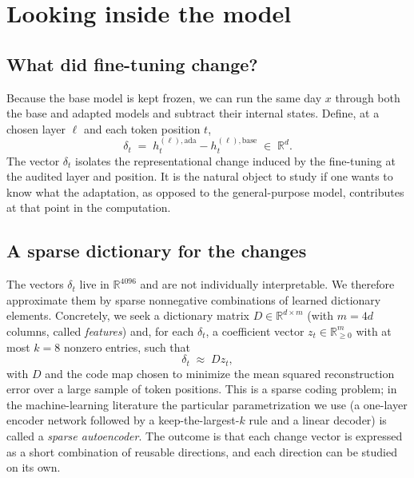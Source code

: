 \documentclass[10pt]{article}
\begin{document}
\section{Looking inside the model}
\label{sec:plain-inside}

\subsection{What did fine-tuning change?}

Because the base model is kept frozen, we can run the same day $x$
through both the base and adapted models and subtract their internal
states. Define, at a chosen layer $\ell$ and each token position $t$,
\begin{equation}
\delta_t \;=\; h^{(\ell), \mathrm{ada}}_t - h^{(\ell),
\mathrm{base}}_t \;\in\; \mathbb{R}^{d}.
\end{equation}
The vector $\delta_t$ isolates the representational change induced by
the fine-tuning at the audited layer and position. It is the natural
object to study if one wants to know what the adaptation, as opposed to
the general-purpose model, contributes at that point in the
computation.

\subsection{A sparse dictionary for the changes}

The vectors $\delta_t$ live in $\mathbb{R}^{4096}$ and are not
individually interpretable. We therefore approximate them by sparse
nonnegative combinations of learned dictionary elements. Concretely, we
seek a dictionary matrix $D \in \mathbb{R}^{d \times m}$ (with $m = 4d$
columns, called \emph{features}) and, for each $\delta_t$, a coefficient
vector $z_t \in \mathbb{R}^{m}_{\geq 0}$ with at most $k = 8$ nonzero
entries, such that
\begin{equation}
\delta_t \;\approx\; D z_t ,
\end{equation}
with $D$ and the code map chosen to minimize the mean squared
reconstruction error over a large sample of token positions. This is a
sparse coding problem; in the machine-learning literature the particular
parametrization we use (a one-layer encoder network followed by a
keep-the-largest-$k$ rule and a linear decoder) is called a \emph{sparse
autoencoder}. The outcome is that each change vector is expressed as a
short combination of reusable directions, and each direction can be
studied on its own.
\end{document}
